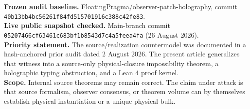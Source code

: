 \documentclass[10pt,a4paper]{article}
\theoremstyle{definition}
\theoremstyle{remark}
\begin{document}
\begin{titlepage}
\vfill
\noindent\textbf{Frozen audit baseline.} FloatingPragma/observer-patch-holography,
commit\\
\texttt{40b13bb4bc56261f84fd515701916c388c42fe83}.\\[2mm]
\noindent\textbf{Live public snapshot checked.} Main-branch commit\\
\texttt{05207466cf63461c683bf1b8543d7c4a5feea4fa} (26 August 2026).\\[2mm]
\noindent\textbf{Priority statement.} The source/realization countermodel was
documented in a hash-anchored prior audit dated 2 August 2026.  The present article generalizes that witness
into a source-only physical-closure impossibility theorem, a holographic typing
obstruction, and a Lean 4 proof kernel.\\[2mm]
\noindent\textbf{Scope.} Internal source theorems may remain correct.  The claim
under attack is that source formalism, observer consensus, or theorem volume
can by themselves establish physical instantiation or a unique physical bulk.

\vspace{8mm}
\noindent{\color{DeepBlue}\rule{\textwidth}{1.2pt}}
\end{titlepage}
\end{document}
